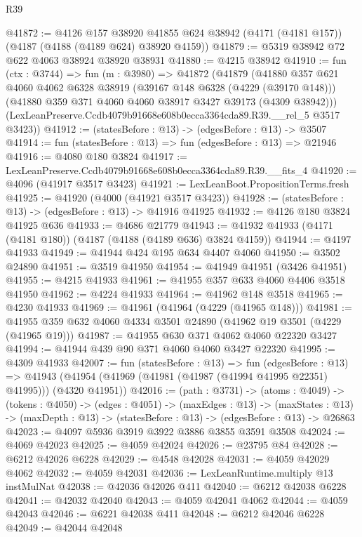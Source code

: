 \begin{lexlean}{R39}
\begin{coremodule}
@41872 := @4126
    @157
    @38920
    @41855
    @624
    @38942
    (@4171 (@4181 @157))
    (@4187 (@4188 (@4189 @624) @38920 @4159))
@41879 := @5319 @38942 @72 @622 @4063 @38924 @38920 @38931
@41880 := @4215 @38942
@41910 := fun (ctx : @3744) =>
  fun (m : @3980) =>
  @41872
    (@41879
      (@41880
        @357
        @621
        @4060
        @4062
        @6328
        @38919
        (@39167 @148 @6328 (@4229 (@39170 @148)))
        (@41880 @359 @371 @4060 @4060 @38917 @3427 @39173 (@4309 @38942)))
      (LexLeanPreserve.Ccdb4079b91668e608b0ecca3364cda89.R39.__rel_5 @3517 @3423))
@41912 := (statesBefore : @13) -> (edgesBefore : @13) -> @3507
@41914 := fun (statesBefore : @13) => fun (edgesBefore : @13) => @21946
@41916 := @4080 @180 @3824
@41917 := LexLeanPreserve.Ccdb4079b91668e608b0ecca3364cda89.R39.__fits_4
@41920 := @4096 (@41917 @3517 @3423)
@41921 := LexLeanBoot.PropositionTerms.fresh
@41925 := @41920 (@4000 (@41921 @3517 @3423))
@41928 := (statesBefore : @13) -> (edgesBefore : @13) -> @41916 @41925
@41932 := @4126 @180 @3824 @41925 @636
@41933 := @4686 @21779
@41943 := @41932 @41933 (@4171 (@4181 @180)) (@4187 (@4188 (@4189 @636) @3824 @4159))
@41944 := @4197 @41933
@41949 := @41944 @424 @195 @634 @4407 @4060
@41950 := @3502 @24890
@41951 := @3519 @41950
@41954 := @41949 @41951 (@3426 @41951)
@41955 := @4215 @41933
@41961 := @41955 @357 @633 @4060 @4406 @3518 @41950
@41962 := @4224 @41933
@41964 := @41962 @148 @3518
@41965 := @4230 @41933
@41969 := @41961 (@41964 (@4229 (@41965 @148)))
@41981 := @41955 @359 @632 @4060 @4334 @3501 @24890 (@41962 @19 @3501 (@4229 (@41965 @19)))
@41987 := @41955 @630 @371 @4062 @4060 @22320 @3427
@41994 := @41944 @439 @90 @371 @4060 @4060 @3427 @22320
@41995 := @4309 @41933
@42007 := fun (statesBefore : @13) =>
  fun (edgesBefore : @13) =>
  @41943 (@41954 (@41969 (@41981 (@41987 (@41994 @41995 @22351) @41995))) (@4320 @41951))
@42016 := (path : @3731) ->
  (atoms : @4049) ->
  (tokens : @4050) ->
  (edges : @4051) ->
  (maxEdges : @13) ->
  (maxStates : @13) -> (maxDepth : @13) -> (statesBefore : @13) -> (edgesBefore : @13) -> @26863
@42023 := @4097 @5936 @3919 @3922 @3886 @3855 @3591 @3508
@42024 := @4069 @42023
@42025 := @4059 @42024
@42026 := @23795 @84
@42028 := @6212 @42026 @6228
@42029 := @4548 @42028
@42031 := @4059 @42029 @4062
@42032 := @4059 @42031
@42036 := LexLeanRuntime.multiply @13 instMulNat
@42038 := @42036 @42026 @411
@42040 := @6212 @42038 @6228
@42041 := @42032 @42040
@42043 := @4059 @42041 @4062
@42044 := @4059 @42043
@42046 := @6221 @42038 @411
@42048 := @6212 @42046 @6228
@42049 := @42044 @42048

\end{coremodule}
\end{lexlean}
